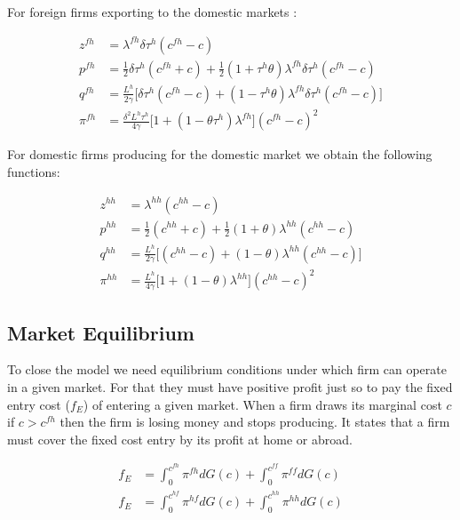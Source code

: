 {For foreign firms exporting to the domestic markets : 

\begin{equation} \label{eq:price_quality_equation}
    \begin{aligned}
    z^{fh} & = \lambda^{fh}\delta \tau^h(c^{fh} - c) \\
    p^{fh} &= \frac{1}{2}\delta \tau^h ( c^{fh} +  c) + \frac{1}{2} (1 + \tau^h\theta)\lambda^{fh}\delta \tau^h(c^{fh} - c)  \\
    q^{fh} &= \frac{L^h}{2\gamma} \big[ \delta \tau^h ( c^{fh} -  c) + (1 - \tau^h\theta) \lambda^{fh}\delta \tau^h(c^{fh} - c)\big] \\
    \pi^{fh} &= \frac{\delta^2 L^h \tau^h}{4\gamma} \big[ 1 + (1 - \theta \tau^h)\lambda^{fh}\big](c^{fh} - c)^2 
    \end{aligned}
\end{equation}

For domestic firms producing for the domestic market we obtain the following functions:

\begin{equation}
\begin{aligned}
    z^{hh} &= \lambda^{hh}(c^{hh} - c) \\
    p^{hh} &= \frac{1}{2}( c^{hh} +  c) + \frac{1}{2} (1 + \theta)\lambda^{hh}(c^{hh} - c)  \\
    q^{hh} &= \frac{L^h}{2\gamma} \big[( c^{hh} -  c) + (1 - \theta) \lambda^{hh}(c^{hh} - c)\big] \\
    \pi^{hh} &= \frac{L^h}{4\gamma} \big[ 1 + (1 - \theta )\lambda^{hh}\big](c^{hh} - c)^2
\end{aligned}
\end{equation}

\subsection{Market Equilibrium}

To close the model we need equilibrium conditions under which firm can operate in a given market. For that they must have positive profit just so to pay the fixed entry cost ($f_E$) of entering a given market. When a firm draws its marginal cost $c$ if $c>c^{fh}$ then the firm is losing money and stops producing. It states that a firm must cover the fixed cost entry by its profit at home or abroad.

\begin{equation} \label{eq:free_entry}
\begin{aligned}
    f_E &= \int_{0}^{c^{fh}} \pi^{fh} dG(c) + \int_{0}^{c^{ff}} \pi^{ff} dG(c) \\  
    f_E &= \int_{0}^{c^{hf}} \pi^{hf} dG(c) + \int_{0}^{c^{hh}} \pi^{hh} dG(c)   
\end{aligned}
\end{equation}

}
